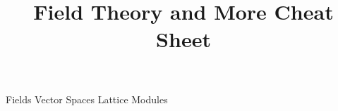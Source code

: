 \documentclass[14pt]{extarticle}
\title{Field Theory and More Cheat Sheet}
\begin{document}
	\maketitle


	\begin{outline}		
		\1	Fields
		\1	Vector Spaces
		\1	Lattice
		\1	Modules

	\end{outline}
\end{document}
